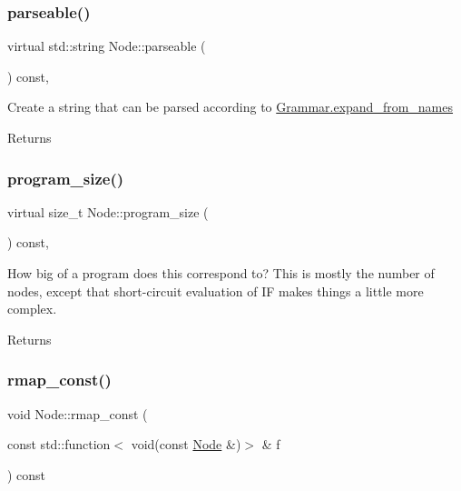 \mbox{\label{class_node_a70e879ceb71f47787137572d9bee8efa}} 
\subsubsection{\texorpdfstring{parseable()}{parseable()}}
{\footnotesize\ttfamily virtual std\+::string Node\+::parseable (\begin{DoxyParamCaption}{ }\end{DoxyParamCaption}) const\hspace{0.3cm}{\ttfamily [inline]}, {\ttfamily [virtual]}}

Create a string that can be parsed according to \hyperlink{class_grammar_ab5bd3d35545bcab4dbd3ca1d136bd4ce}{Grammar.\+expand\+\_\+from\+\_\+names} \begin{DoxyReturn}{Returns}

\end{DoxyReturn}
\mbox{\label{class_node_a377548bcf1be99ac5181f9434c33c81e}} 
\subsubsection{\texorpdfstring{program\+\_\+size()}{program\_size()}}
{\footnotesize\ttfamily virtual size\+\_\+t Node\+::program\+\_\+size (\begin{DoxyParamCaption}{ }\end{DoxyParamCaption}) const\hspace{0.3cm}{\ttfamily [inline]}, {\ttfamily [virtual]}}

How big of a program does this correspond to? This is mostly the number of nodes, except that short-\/circuit evaluation of IF makes things a little more complex. \begin{DoxyReturn}{Returns}

\end{DoxyReturn}
\mbox{\label{class_node_a59da25cea338385d73b898b86492f97e}} 
\subsubsection{\texorpdfstring{rmap\+\_\+const()}{rmap\_const()}}
{\footnotesize\ttfamily void Node\+::rmap\+\_\+const (\begin{DoxyParamCaption}\item[{const std\+::function$<$ void(const \hyperlink{class_node}{Node} \&)$>$ \&}]{f }\end{DoxyParamCaption}) const\hspace{0.3cm}{\ttfamily [inline]}}

